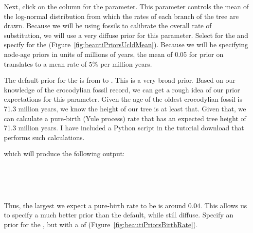 {    Next, click on the  column for the
     parameter.
    This parameter controls the mean of the log-normal distribution from which
    the rates of each branch of the tree are drawn.
    Because we will be using fossils to calibrate the overall rate of substitution,
    we will use a very diffuse prior for this parameter.
    Select  for the 
    and specify  for the 
    (Figure~\ref{fig:beautiPriorsUcldMean}).
    Because we will be specifying node-age priors in units of millions of
    years, the mean of 0.05 for prior on 
    translates to a mean rate of 5\% per million years.


    The default prior for the 
    is  from  to .
    This is a very broad prior.
    Based on our knowledge of the crocodylian fossil record, we can get
    a rough idea of our prior expectations for this parameter.
    Given the age of the oldest crocodylian fossil is 71.3 million
    years, we know the height of our tree is at least that.
    Given that, we can calculate a pure-birth (Yule process) rate that has an
    expected tree height of 71.3 million years.
    I have included a Python script  in the tutorial
    download that performs such calculations.

    \hspace{1cm}

    which will produce the following output:

    \\
    \\
    \\

    Thus, the largest we expect a pure-birth rate to be is around 0.04.
    This allows us to specify a much better prior than the default, while
    still diffuse.
    Specify an  prior for the
    , but with a  of
     (Figure~\ref{fig:beautiPriorsBirthRate}).

}
